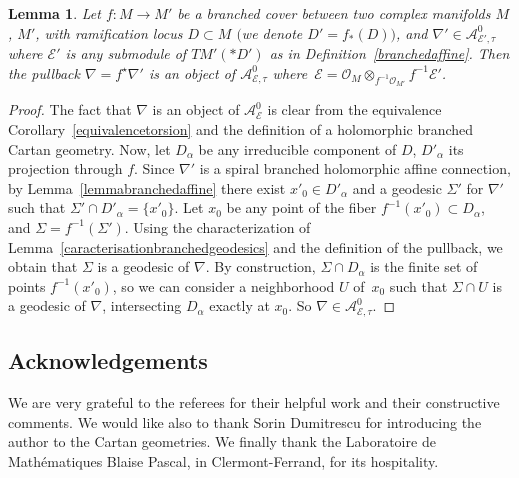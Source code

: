 \documentclass[10pt,a4paper]{amsart}
\numberwithin{equation}{section}
\newtheorem{Lemma}[Theorem]{Lemma}
\begin{document}
 \begin{Lemma} Let $f\colon M\longrightarrow M'$ be a branched cover between two complex manifolds $M$, $M'$, with ramification locus $D\subset M$ $($we denote $D'=f_*(D))$, and $\nabla' \in \mathcal{A}^0_{\mathcal{E}',\tau}$ where $\mathcal{E}'$ is any submodule of $TM'(* D')$ as in Definition~{\rm \ref{branchedaffine}}. Then the pullback $\nabla=f^\star \nabla'$ is an object of $\mathcal{A}^0_{\mathcal{E},\tau}$ where~$\mathcal{E}=\mathcal{O}_M \otimes_{f^{-1}\mathcal{O}_{M'}} f^{-1} \mathcal{E}'$. \end{Lemma}

  \begin{proof} The fact that $\nabla$ is an object of $\mathcal{A}^0_{\mathcal{E}}$ is clear from the equivalence Corollary~\ref{equivalencetorsion} and the definition of a holomorphic branched Cartan geometry. Now, let $D_\alpha$ be any irreducible component of $D$, $D'_\alpha$ its projection through $f$. Since $\nabla'$ is a spiral branched holomorphic affine connection, by Lemma~\ref{lemmabranchedaffine} there exist $x'_0 \in D'_\alpha$ and a geodesic $\Sigma'$ for $\nabla'$ such that $\Sigma'\cap D'_\alpha = \{x'_0\}$. Let $x_0$ be any point of the fiber $f^{-1}(x'_0) \subset D_\alpha$, and $\Sigma=f^{-1}(\Sigma')$. Using the characterization of Lemma~\ref{caracterisationbranchedgeodesics} and the definition of the pullback, we obtain that $\Sigma$ is a geodesic of $\nabla$. By construction, $\Sigma \cap D_\alpha$ is the finite set of points $f^{-1}(x'_0)$, so we can consider a neighborhood $U$ of~$x_0$ such that $\Sigma\cap U$ is a geodesic of $\nabla$, intersecting $D_\alpha$ exactly at $x_0$. So $\nabla \in \mathcal{A}^0_{\mathcal{E},\tau}$.
\end{proof}

\vspace{-1mm}

\subsection*{Acknowledgements}
We are very grateful to the referees for their helpful work and their constructive comments.
We would like also to thank Sorin Dumitrescu for introducing the author to the Cartan geometries. We finally thank the Laboratoire de Math\'ematiques Blaise Pascal, in Clermont-Ferrand, for its hospitality.

\end{document}
